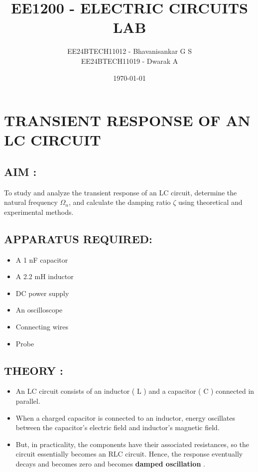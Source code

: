 \documentclass[12pt]{article}
\title{\textbf{EE1200 - ELECTRIC CIRCUITS LAB}}
\author{EE24BTECH11012 - Bhavanisankar G S \\ EE24BTECH11019 - Dwarak A}
\date{\today}
\begin{document}
\maketitle
\thispagestyle{empty}

\newpage

\section{TRANSIENT RESPONSE OF AN LC CIRCUIT}

\subsection{\textbf{AIM :}}
To study and analyze the transient response of an LC circuit, determine the natural frequency $\Omega_{n}$, and calculate the damping ratio $\zeta$ using theoretical and experimental methods.

\subsection{\textbf{APPARATUS REQUIRED: }}
\begin{itemize}
\item A 1 nF capacitor
\item A 2.2 mH inductor
\item DC power supply
\item An oscilloscope
\item Connecting wires
\item Probe
\end{itemize}

\subsection{\textbf{THEORY : }}
\begin{itemize}
\item An LC circuit consists of an inductor ( L ) and a capacitor ( C ) connected in parallel.
\item When a charged capacitor is connected to an inductor, energy oscillates between the capacitor's electric field and inductor's magnetic field.
\item But, in practicality, the components have their associated resistances, so the circuit essentially becomes an RLC circuit. Hence, the response eventually decays and becomes zero and becomes \textbf{damped oscillation} .
\end{itemize}
\end{document}
